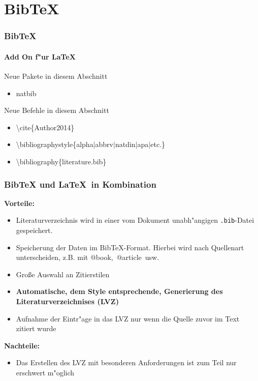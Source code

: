 \section{BibTeX}
\begin{frame}
\frametitle{BibTeX}
\framesubtitle{Add On f"ur \LaTeX}
\begin{exampleblock}{Neue Pakete in diesem Abschnitt}
\begin{itemize}
\item natbib
\end{itemize}
\end{exampleblock}

\begin{block}{Neue Befehle in diesem Abschnitt}
\begin{itemize}
\item \color{nounibaredI}\textbackslash cite\color{black}\{Author2014\}
\item \color{nounibaredI}\textbackslash bibliographystyle\color{black}\{alpha$\mid$abbrv$\mid$natdin$\mid$apa$\mid$etc.\}
\item \color{nounibaredI}\textbackslash bibliography\color{black}\{literature.bib\}
\end{itemize}
\end{block}
\end{frame}

\begin{frame}
\frametitle{BibTeX und \LaTeX ~in Kombination}
\textbf{Vorteile:}
\begin{itemize}
\item Literaturverzeichnis wird in einer vom Dokument unabh"angigen \texttt{.bib}-Datei gespeichert.
\item Speicherung der Daten im BibTeX-Format. Hierbei wird nach Quellenart unterscheiden, z.B. mit \color{nounibaredI}$@$book\color{black},~\color{nounibaredI}$@$article\color{black}~usw.
\item Gro\ss e Auswahl an Zitierstilen
\item \textbf{Automatische, dem Style entsprechende, Generierung des Literaturverzeichnises (LVZ)}
\item Aufnahme der Eintr"age in das LVZ nur wenn die Quelle zuvor im Text zitiert wurde
\end{itemize}
\textbf{Nachteile:}
\begin{itemize}
\item Das Erstellen des LVZ mit besonderen Anforderungen ist zum Teil nur erschwert m"oglich
\end{itemize}
\end{frame}

